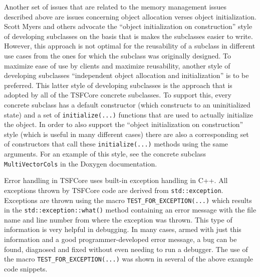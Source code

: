 Another set of issues that are related to the memory management issues
described above are issues concerning object allocation verses object
initialization.  Scott Myers \cite{ref:meyers_1996} and others
advocate the ``object initialization on construction'' style of
developing subclasses on the basis that is makes the subclasses easier
to write.  However, this approach is not optimal for the reusability of
a subclass in different use cases from the ones for which the subclass
was originally designed.  To maximize ease of use by clients and
maximize reusability, another style of developing subclasses
``independent object allocation and initialization'' is to be
preferred.  This latter style of developing subclasses is the approach
that is adopted by all of the TSFCore concrete subclasses.  To support
this, every concrete subclass has a default constructor (which
constructs to an uninitialized state) and a set of
\texttt{initialize(...)}  functions that are used to actually
initialize the object.  In order to also support the ``object
initialization on construction'' style (which is useful in many
different cases) there are also a corresponding set of constructors
that call these \texttt{initialize(...)} methods using the same
arguments.  For an example of this style, see the concrete subclass
\texttt{MultiVectorCols} in the Doxygen documentation.

Error handling in TSFCore uses built-in exception handling in C++.
All exceptions thrown by TSFCore code are derived from
\texttt{std::exception}.  Exceptions are thrown using the macro
\texttt{TEST\_FOR\_EXCEPTION(...)} which results in the \texttt{std::exception::what()}
method containing an error message with the file name and line number
from where the exception was thrown.  This type of information is very
helpful in debugging.  In many cases, armed with just this information
and a good programmer-developed error message, a bug can be found,
diagnosed and fixed without even needing to run a debugger.  The use
of the macro \texttt{TEST\_FOR\_EXCEPTION(...)} was shown in several of
the above example code snippets.

